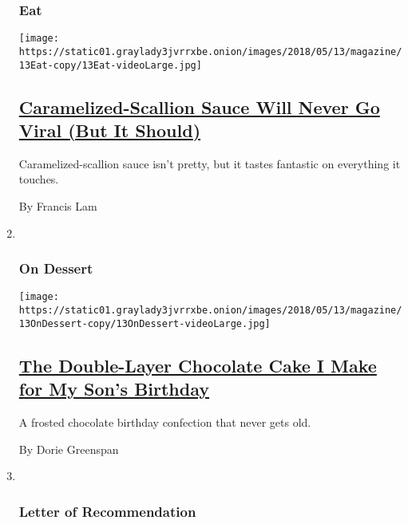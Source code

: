 \begin{enumerate}
{  \subsubsection{Eat}\label{eat}}

  \texttt{[image: https://static01.graylady3jvrrxbe.onion/images/2018/05/13/magazine/13Eat-copy/13Eat-videoLarge.jpg]}

  \hypertarget{caramelized-scallion-sauce-will-never-go-viral-but-it-should}{%
  \subsection{\texorpdfstring{\href{/2018/05/08/magazine/caramelized-scallion-sauce-viral-chinese-barbecue.html}{Caramelized-Scallion
  Sauce Will Never Go Viral (But It
  Should)}}{Caramelized-Scallion Sauce Will Never Go Viral (But It Should)}}\label{caramelized-scallion-sauce-will-never-go-viral-but-it-should}}

  Caramelized-scallion sauce isn't pretty, but it tastes fantastic on
  everything it touches.

  By Francis Lam
\item ~
  \hypertarget{on-dessert}{%
  \subsubsection{On Dessert}\label{on-dessert}}

  \texttt{[image: https://static01.graylady3jvrrxbe.onion/images/2018/05/13/magazine/13OnDessert-copy/13OnDessert-videoLarge.jpg]}

  \hypertarget{the-double-layer-chocolate-cake-i-make-for-my-sons-birthday}{%
  \subsection{\texorpdfstring{\href{/2018/05/09/magazine/chocolate-cake-sons-birthday-devils-food.html}{The
  Double-Layer Chocolate Cake I Make for My Son's
  Birthday}}{The Double-Layer Chocolate Cake I Make for My Son's Birthday}}\label{the-double-layer-chocolate-cake-i-make-for-my-sons-birthday}}

  A frosted chocolate birthday confection that never gets old.

  By Dorie Greenspan
\item ~
  \hypertarget{letter-of-recommendation}{%
  \subsubsection{Letter of
  Recommendation}\label{letter-of-recommendation}}


\end{enumerate}
